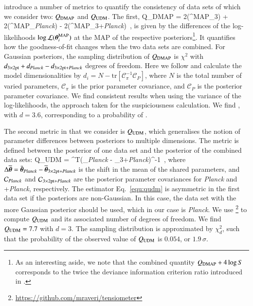 \citet{Raveri2019} introduce a number of metrics to quantify the consistency of data sets of which we consider two: $Q_{\rm DMAP}$ and $Q_{\rm UDM}$. 
The first,
\be
	Q_{\rm DMAP} =  2\log{}(\vec\theta^{\rm MAP}_{\rm 3}) + 2\log{}(\vec\theta^{\rm MAP}_{\it Planck}) - 2\log{}(\vec\theta^{\rm MAP}_{{\rm 3+}{\it Planck}}) \,,
\ee
is given by the differences of the log-likelihoods $\log\mathcal{L}(\vec\theta^{\rm MAP}_{i})$ at the MAP of the respective posteriors\footnote{As an interesting aside, we note that the combined quantity $Q_{\rm DMAP} + 4\log S$ corresponds to the twice the deviance information criterion ratio introduced in \citet{joudaki/etal:2017}.}. 
It quantifies how the goodness-of-fit changes when the two data sets are combined. 
For Gaussian posteriors, the sampling distribution of $Q_{\rm DMAP}$ is $\chi^{2}$ with $d_{\rm 3\times2pt} + d_{\it Planck} - d_{{\rm 3\times2pt+}{\it Planck}}$ degrees of freedom. 
Here we follow \citet{Raveri2019} and calculate the model dimensionalities by $d_{i} = N - \mathrm{tr}[\mathcal{C}_{\pi}^{-1}\mathcal{C}_{P}]$, where $N$ is the total number of varied parameters, $\mathcal{C}_{\pi}$ is the prior parameter covariance, and $\mathcal{C}_{P}$ is the posterior parameter covariance. 
We find consistent results when using the variance of the log-likelihoods, the approach taken for the suspiciousness calculation.
We find , with $d=3.6$, corresponding to a probability of . 


The second metric in \citet{Raveri2019} that we consider is $Q_{\rm UDM}$, which generalises the notion of parameter differences between posteriors to multiple dimensions. 
The metric is defined between the posterior of one data set and the posterior of the combined data sets:
\be
\label{equ:qudm}
	Q_{\rm UDM} = \Delta\overline{\vec\theta}^{T}(_{\it Planck} - _{{\rm 3+}{\it Planck}})^{-1}\Delta\overline{\vec\theta} \,,
\ee
where $\Delta\overline{\vec\theta} = \bar{\vec\theta}_{\it Planck} - \overline{\vec\theta}_{{\rm 3\times2pt+}{\it Planck}}$ is the shift in the mean of the shared parameters, and $\mathcal{C}_{\it Planck}$ and $\mathcal{C}_{{\rm 3\times2pt+}{\it Planck}}$ are the posterior parameter covariances for {\it Planck} and \tttp+{\it Planck}, respectively. 
The estimator Eq.~\eqref{equ:qudm} is asymmetric in the first data set if the posteriors are non-Gaussian. 
In this case, the data set with the more Gaussian posterior should be used, which in our case is {\it Planck}. 
We use \footnote{\url{https://github.com/mraveri/tensiometer}} to compute $Q_{\rm UDM}$ and its associated number of degrees of freedom. 
We find $Q_{\rm UDM} = 7.7$ with $d = 3$. The sampling distribution is approximated by $\chi^{2}_{d}$, such that the probability of the observed value of $Q_{\rm UDM} $ is $0.054$, or $1.9\,\sigma$. 

